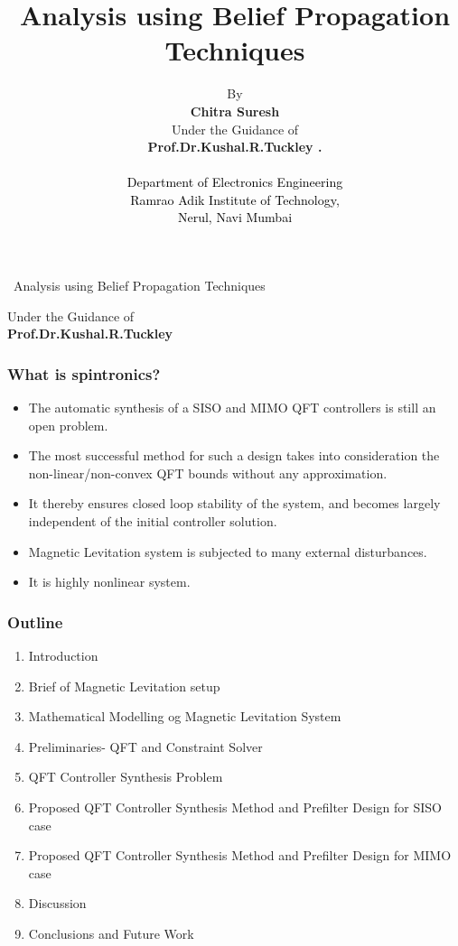\documentclass{beamer}
\title{Analysis using Belief Propagation Techniques}
\begin{document}
\author[Chitra Suresh] {By \\ \vspace{0.05in} \textbf{Chitra Suresh } \\ \vspace{0.01in} {Under the Guidance of} \\ \textbf{Prof.Dr.Kushal.R.Tuckley . }\\
\textcolor{black}{ \\ Department of Electronics Engineering} \\ \textcolor{black}{Ramrao Adik Institute of Technology,\\ Nerul, Navi Mumbai } \\}

\begin{frame}
\begin{center}
\end{center}
\ Analysis using Belief Propagation Techniques

Under the Guidance of \\ \textbf{Prof.Dr.Kushal.R.Tuckley }

\end{frame}




\begin{frame}
\frametitle{What is spintronics?}
\begin{itemize}
\item {The automatic synthesis of a SISO and MIMO QFT controllers is still
an open problem.}
\item {The most successful method for such a design takes
into consideration the non-linear/non-convex QFT bounds without any
approximation.}
\item {It thereby ensures closed loop stability of the
system, and becomes largely independent of the initial controller
solution.}
\item {Magnetic Levitation system is subjected to many external
disturbances.}
\item {It is highly nonlinear system.}
\end{itemize}
\end{frame}


\begin{frame}
\frametitle{Outline}
\begin{enumerate}
\item {Introduction}
\item {Brief of Magnetic Levitation setup}
\item {Mathematical Modelling og Magnetic Levitation System}
\item {Preliminaries- QFT and Constraint Solver}
\item {QFT Controller Synthesis Problem}
\item {Proposed QFT Controller Synthesis Method and Prefilter Design  for SISO case}
\item {Proposed QFT Controller Synthesis Method and Prefilter Design  for MIMO case}
\item {Discussion}
\item {Conclusions and Future Work}
\end{enumerate}
\end{frame}
\end{document}
